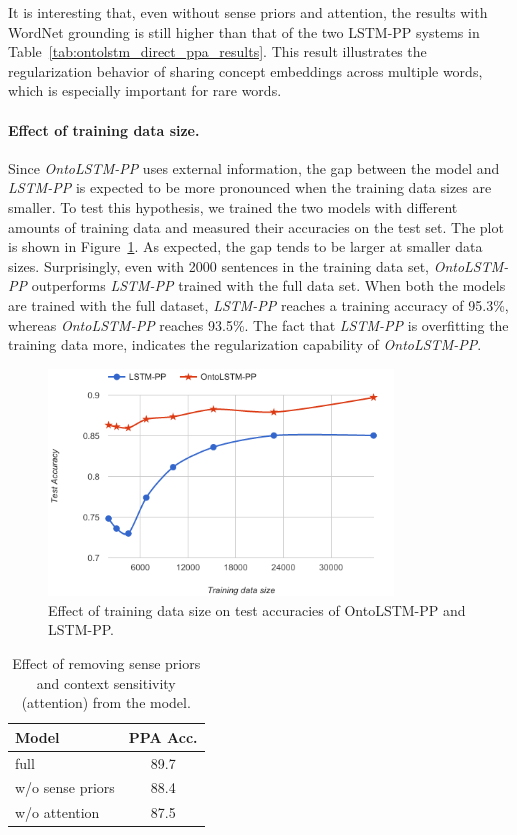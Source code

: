 It is interesting that, even without sense priors and attention, the results with WordNet grounding is still higher than that of the two LSTM-PP systems in Table~\ref{tab:ontolstm_direct_ppa_results}.
This result illustrates the regularization behavior of sharing concept embeddings across multiple words, which is especially important for rare words.

\paragraph{Effect of training data size.}
Since \textit{OntoLSTM-PP} uses external information, the gap between the model and \textit{LSTM-PP} is expected to be more pronounced when the training data sizes are smaller. To test this hypothesis, we trained the two models with different amounts of training data and measured their accuracies on the test set. The plot is shown in Figure~\ref{fig:ontolstm_pp_data_size_variation}. As expected, the gap tends to be larger at smaller data sizes. Surprisingly, even with 2000 sentences in the training data set, \textit{OntoLSTM-PP} outperforms \textit{LSTM-PP} trained with the full data set. 
When both the models are trained with the full dataset, \textit{LSTM-PP} reaches a training accuracy of 95.3\%, whereas \textit{OntoLSTM-PP} reaches 93.5\%. The fact that \textit{LSTM-PP} is overfitting the training data more, indicates the regularization capability of \textit{OntoLSTM-PP}.
\begin{figure}
\begin{center}
\includegraphics[width=3.6in]{figures/training_data_size.png}
\caption{Effect of training data size on test accuracies of OntoLSTM-PP and LSTM-PP.}
\label{fig:ontolstm_pp_data_size_variation}
\end{center}
\end{figure}

\begin{table}
    \centering
    \begin{tabular}{lc}
    \toprule
    \textbf{Model}	& \textbf{PPA Acc.}\\
    \midrule
    full		& 89.7 \\
    w/o sense priors	& 88.4 \\
    w/o attention		& 87.5 \\
    \bottomrule
    \end{tabular}
    \caption{Effect of removing sense priors and context sensitivity (attention) from the model.}\label{tab:ontolstm_pp_ablation_results}
\end{table}

